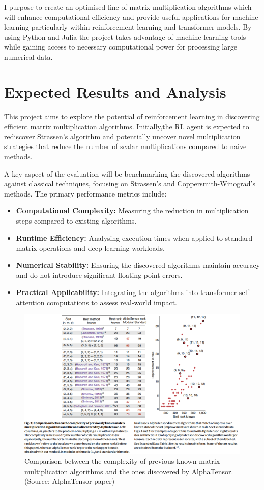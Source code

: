 \documentclass{article}
\begin{document}
I purpose to create an optimised line of matrix multiplication algorithms which will enhance computational efficiency and provide useful applications for machine learning particularly within reinforcement learning and transformer models. By using Python and Julia the project takes advantage of machine learning tools while gaining access to necessary computational power for processing large numerical data.

\section{Expected Results and Analysis}
This project aims to explore the potential of reinforcement learning in discovering efficient matrix multiplication algorithms. Initially,the RL agent is expected to rediscover Strassen's algorithm and potentially uncover novel multiplication strategies that reduce the number of scalar multiplications compared to naive methods.  

A key aspect of the evaluation will be benchmarking the discovered algorithms against classical techniques, focusing on Strassen's and Coppersmith-Winograd's methods. The primary performance metrics include:  

\begin{itemize}
    \item \textbf{Computational Complexity:} Measuring the reduction in multiplication steps compared to existing algorithms.
    \item \textbf{Runtime Efficiency:} Analysing execution times when applied to standard matrix operations and deep learning workloads.
    \item \textbf{Numerical Stability:} Ensuring the discovered algorithms maintain accuracy and do not introduce significant floating-point errors.
    \item \textbf{Practical Applicability:} Integrating the algorithms into transformer self-attention computations to assess real-world impact.
\end{itemize}

\begin{figure}[H]
    \centering
    \includegraphics[width=0.6\linewidth]{Picture4.png}
    \caption{Comparison between the complexity of previous known matrix multiplication algorithms and the ones discovered by AlphaTensor. (Source: AlphaTensor paper)}
    \label{fig:comparison-alphatensor}
\end{figure}
\end{document}
